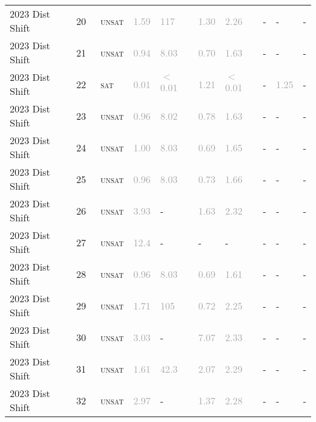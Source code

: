 \begin{center}
{\begin{longtable}{@{}llllllllll@{}}
2023 Dist Shift & 20 & ~\textsc{unsat} & \textcolor{darkgray}{1.59} & \textcolor{darkgray}{117} & \textcolor{darkgray}{1.30} & \textcolor{darkgray}{2.26} & - & - & - \\
2023 Dist Shift & 21 & ~\textsc{unsat} & \textcolor{darkgray}{0.94} & \textcolor{darkgray}{8.03} & \textcolor{darkgray}{0.70} & \textcolor{darkgray}{1.63} & - & - & - \\
2023 Dist Shift & 22 & ~\textsc{sat} & \textcolor{darkgray}{0.01} & \textcolor{darkgray}{$<$0.01} & \textcolor{darkgray}{1.21} & \textcolor{darkgray}{$<$0.01} & - & \textcolor{darkgray}{1.25} & - \\
2023 Dist Shift & 23 & ~\textsc{unsat} & \textcolor{darkgray}{0.96} & \textcolor{darkgray}{8.02} & \textcolor{darkgray}{0.78} & \textcolor{darkgray}{1.63} & - & - & - \\
2023 Dist Shift & 24 & ~\textsc{unsat} & \textcolor{darkgray}{1.00} & \textcolor{darkgray}{8.03} & \textcolor{darkgray}{0.69} & \textcolor{darkgray}{1.65} & - & - & - \\
2023 Dist Shift & 25 & ~\textsc{unsat} & \textcolor{darkgray}{0.96} & \textcolor{darkgray}{8.03} & \textcolor{darkgray}{0.73} & \textcolor{darkgray}{1.66} & - & - & - \\
2023 Dist Shift & 26 & ~\textsc{unsat} & \textcolor{darkgray}{3.93} & - & \textcolor{darkgray}{1.63} & \textcolor{darkgray}{2.32} & - & - & - \\
2023 Dist Shift & 27 & ~\textsc{unsat} & \textcolor{darkgray}{12.4} & - & - & - & - & - & - \\
2023 Dist Shift & 28 & ~\textsc{unsat} & \textcolor{darkgray}{0.96} & \textcolor{darkgray}{8.03} & \textcolor{darkgray}{0.69} & \textcolor{darkgray}{1.61} & - & - & - \\
2023 Dist Shift & 29 & ~\textsc{unsat} & \textcolor{darkgray}{1.71} & \textcolor{darkgray}{105} & \textcolor{darkgray}{0.72} & \textcolor{darkgray}{2.25} & - & - & - \\
2023 Dist Shift & 30 & ~\textsc{unsat} & \textcolor{darkgray}{3.03} & - & \textcolor{darkgray}{7.07} & \textcolor{darkgray}{2.33} & - & - & - \\
2023 Dist Shift & 31 & ~\textsc{unsat} & \textcolor{darkgray}{1.61} & \textcolor{darkgray}{42.3} & \textcolor{darkgray}{2.07} & \textcolor{darkgray}{2.29} & - & - & - \\
2023 Dist Shift & 32 & ~\textsc{unsat} & \textcolor{darkgray}{2.97} & - & \textcolor{darkgray}{1.37} & \textcolor{darkgray}{2.28} & - & - & - \\

\end{longtable}}
\end{center}
